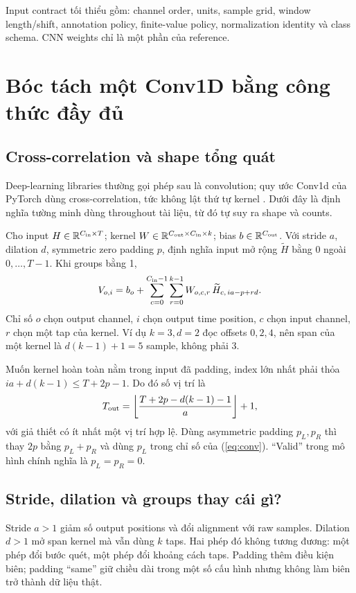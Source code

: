 \documentclass[11pt,a4paper]{article}
\newcommand{\R}{\mathbb R}
\theoremstyle{definition}
\begin{document}
Input contract tối thiểu gồm: channel order, units, sample grid, window
length/shift, annotation policy, finite-value policy, normalization
identity và class schema. CNN weights chỉ là một phần của reference.

\section{Bóc tách một Conv1D bằng công thức đầy đủ}
\subsection{Cross-correlation và shape tổng quát}
Deep-learning libraries thường gọi phép sau là convolution; quy ước
Conv1d của PyTorch dùng cross-correlation, tức không lật thứ tự kernel
\cite{torchconv}. Dưới đây là định nghĩa tường minh dùng throughout tài
liệu, từ đó tự suy ra shape và counts.

Cho input $H\in\R^{C_{\rm in}\times T}$; kernel
$W\in\R^{C_{\rm out}\times C_{\rm in}\times k}$; bias
$b\in\R^{C_{\rm out}}$. Với stride $a$, dilation $d$, symmetric zero
padding $p$, định nghĩa input mở rộng $\widetilde H$ bằng 0 ngoài
$0,\ldots,T-1$. Khi groups bằng 1,
\begin{equation}
V_{o,i}=b_o+\sum_{c=0}^{C_{\rm in}-1}\sum_{r=0}^{k-1}
 W_{o,c,r}\,\widetilde H_{c,\,ia-p+rd}.
\label{eq:conv}
\end{equation}
Chỉ số $o$ chọn output channel, $i$ chọn output time position, $c$ chọn
input channel, $r$ chọn một tap của kernel. Ví dụ $k=3,d=2$ đọc offsets
$0,2,4$, nên span của một kernel là $d(k-1)+1=5$ sample, không phải 3.

Muốn kernel hoàn toàn nằm trong input đã padding, index lớn nhất phải
thỏa $ia+d(k-1)\le T+2p-1$. Do đó số vị trí là
\begin{equation}
T_{\rm out}=\left\lfloor\frac{T+2p-d(k-1)-1}{a}\right\rfloor+1,
\label{eq:length}
\end{equation}
với giả thiết có ít nhất một vị trí hợp lệ. Dùng asymmetric padding
$p_L,p_R$ thì thay $2p$ bằng $p_L+p_R$ và dùng $p_L$ trong chỉ số của
(\ref{eq:conv}). ``Valid'' trong mô hình chính nghĩa là $p_L=p_R=0$.

\subsection{Stride, dilation và groups thay cái gì?}
Stride $a>1$ giảm số output positions và đổi alignment với raw samples.
Dilation $d>1$ mở span kernel mà vẫn dùng $k$ taps. Hai phép đó không
tương đương: một phép đổi bước quét, một phép đổi khoảng cách taps.
Padding thêm điều kiện biên; padding ``same'' giữ chiều dài trong một
số cấu hình nhưng không làm biên trở thành dữ liệu thật.
\end{document}
